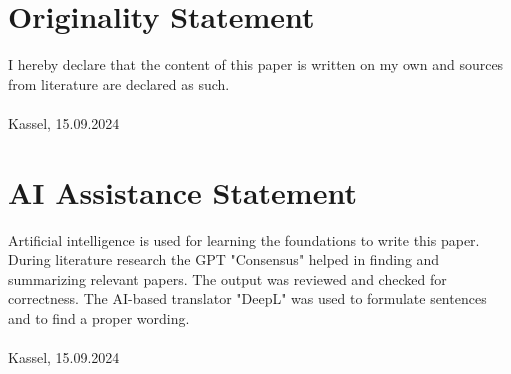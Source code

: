 \section{Originality Statement}
I hereby declare that the content of this paper is written on my own and sources from literature are declared as such.\vspace{2cm}\\
\underline{\hspace{10cm}}\\
\footnotesize Kassel, 15.09.2024 \normalsize
\section{AI Assistance Statement}
Artificial intelligence is used for learning the foundations to write this paper. During literature research the GPT "Consensus" helped in finding and summarizing relevant papers. The output was reviewed and checked for correctness. The AI-based translator "DeepL" was used to formulate sentences and to find a proper wording.\vspace{2cm}\\
\underline{\hspace{10cm}}\\
\footnotesize Kassel, 15.09.2024 \normalsize
